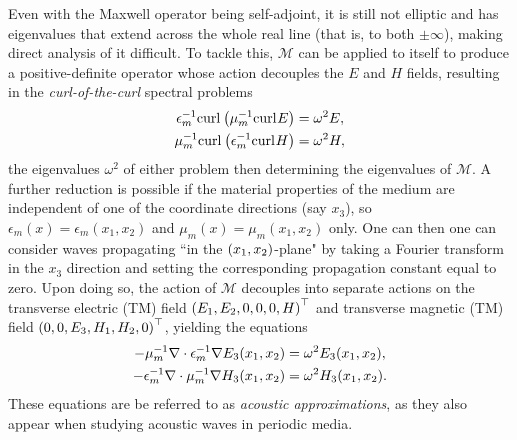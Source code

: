 Even with the Maxwell operator being self-adjoint, it is still not elliptic and has eigenvalues that extend across the whole real line (that is, to both $\pm\infty$), making direct analysis of it difficult.
To tackle this, $\mathcal{M}$ can be applied to itself to produce a positive-definite operator whose action decouples the $E$ and $H$ fields, resulting in the \emph{curl-of-the-curl} spectral problems
\begin{subequations} \label{eq:Intro-CurlCurlEqns}
	\begin{align}
		\epsilon_m^{-1}\mathrm{curl}_{}\left( \mu_m^{-1}\mathrm{curl}_{}E \right) &= \omega^2 E, \\
		\mu_m^{-1}\mathrm{curl}_{}\left( \epsilon_m^{-1}\mathrm{curl}_{}H \right) &= \omega^2 H,
	\end{align}
\end{subequations}
the eigenvalues $\omega^2$ of either problem then determining the eigenvalues of $\mathcal{M}$.
A further reduction is possible if the material properties of the medium are independent of one of the coordinate directions (say $x_3$), so $\epsilon_m(x)=\epsilon_m(x_1,x_2)$ and $\mu_m(x)=\mu_m(x_1,x_2)$ only.
One can then one can consider waves propagating ``in the $\left( x_1,x_2 \right)$-plane" by taking a Fourier transform in the $x_3$ direction and setting the corresponding propagation constant equal to zero.
Upon doing so, the action of $\mathcal{M}$ decouples into separate actions on the transverse electric (TM) field $\left( E_1,E_2,0,0,0,H \right)^\top$ and transverse magnetic (TM) field $\left( 0,0,E_3,H_1,H_2,0 \right)^\top$, yielding the equations
\begin{subequations} \label{eq:Intro-AcousticApprox}
	\begin{align}
		-\mu_m^{-1}\nabla\cdot\epsilon_m^{-1}\nabla E_3(x_1,x_2) &= \omega^2 E_3(x_1,x_2), \\
		-\epsilon_m^{-1}\nabla\cdot\mu_m^{-1}\nabla H_3(x_1,x_2) &= \omega^2 H_3(x_1,x_2).
	\end{align}
\end{subequations}
These equations are be referred to as \emph{acoustic approximations}, as they also appear when studying acoustic waves in periodic media.

